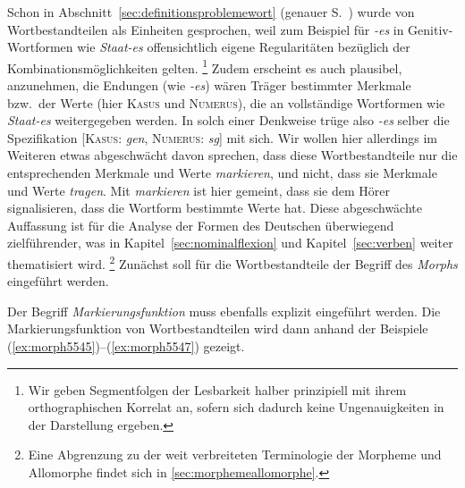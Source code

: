 \label{sec:morphe}

Schon in Abschnitt~\ref{sec:definitionsproblemewort} (genauer S.~\pageref{arbref:9234645}) wurde von Wortbestandteilen als Einheiten gesprochen, weil zum Beispiel für \textit{-es} in Genitiv-Wortformen wie \textit{Staat-es} offensichtlich eigene Regularitäten bezüglich der Kombinationsmöglichkeiten gelten.%
\footnote{Wir geben Segmentfolgen der Lesbarkeit halber prinzipiell mit ihrem orthographischen Korrelat an, sofern sich dadurch keine Ungenauigkeiten in der Darstellung ergeben.}
Zudem erscheint es auch plausibel, anzunehmen, die Endungen (wie \textit{-es}) wären Träger bestimmter Merkmale bzw.\ der Werte (hier \textsc{Kasus} und \textsc{Numerus}), die an vollständige Wortformen wie \textit{Staat-es} weitergegeben werden.
In solch einer Denkweise trüge also \textit{-es} selber die Spezifikation [\textsc{Kasus}: \textit{gen}, \textsc{Numerus}: \textit{sg}] mit sich.
Wir wollen hier allerdings im Weiteren etwas abgeschwächt davon sprechen, dass diese Wortbestandteile nur die entsprechenden Merkmale und Werte \textit{markieren}, und nicht, dass sie Merkmale und Werte \textit{tragen}.
Mit \textit{markieren} ist hier gemeint, dass sie dem Hörer signalisieren, dass die Wortform bestimmte Werte hat.
Diese abgeschwächte Auffassung ist für die Analyse der Formen des Deutschen überwiegend zielführender, was in Kapitel~\ref{sec:nominalflexion} und Kapitel~\ref{sec:verben} weiter thematisiert wird.%
\footnote{Eine Abgrenzung zu der weit verbreiteten Terminologie der Morpheme und Allomorphe findet sich in \ref{sec:morphemeallomorphe}.}
Zunächst soll für die Wortbestandteile der Begriff des \textit{Morphs} eingeführt werden.


Der Begriff \textit{Markierungsfunktion} muss ebenfalls explizit eingeführt werden.
Die Markierungsfunktion von Wortbestandteilen wird dann anhand der Beispiele (\ref{ex:morph5545})--(\ref{ex:morph5547}) gezeigt.


